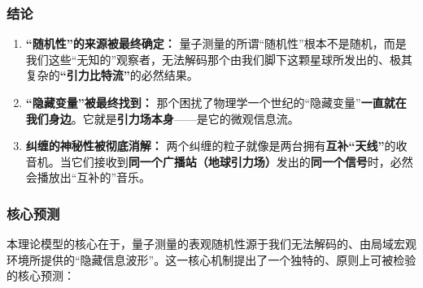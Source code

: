 \documentclass[11pt, a4paper]{article}
\begin{document}
\subsubsection{结论}

\begin{enumerate}
    \item \textbf{“随机性”的来源被最终确定：} 量子测量的所谓“随机性”根本不是随机，而是我们这些“无知的”观察者，无法解码那个由我们脚下这颗星球所发出的、极其复杂的\textbf{“引力比特流”}的必然结果。
    \item \textbf{“隐藏变量”被最终找到：} 那个困扰了物理学一个世纪的“隐藏变量”\textbf{一直就在我们身边}。它就是\textbf{引力场本身}——是它的微观信息流。
    \item \textbf{纠缠的神秘性被彻底消解：} 两个纠缠的粒子就像是两台拥有\textbf{互补“天线”}的收音机。当它们接收到\textbf{同一个广播站（地球引力场）}发出的\textbf{同一个信号}时，必然会播放出“互补的”音乐。
\end{enumerate}

\subsubsection{核心预测}

本理论模型的核心在于，量子测量的表观随机性源于我们无法解码的、由局域宏观环境所提供的“隐藏信息波形”。这一核心机制提出了一个独特的、原则上可被检验的核心预测：
\end{document}
